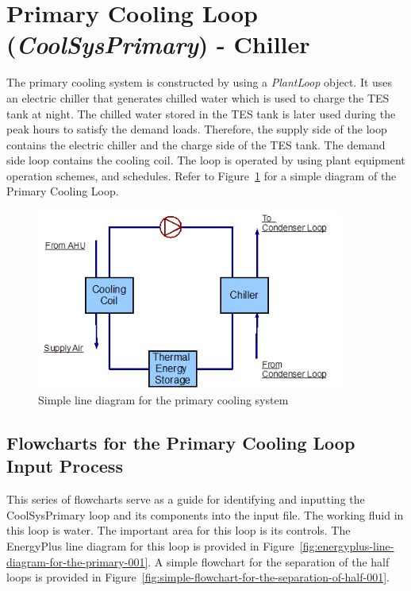 \section{Primary Cooling Loop (\emph{CoolSysPrimary}) - Chiller}\label{primary-cooling-loop-coolsysprimary---chiller}

The primary cooling system is constructed by using a \emph{PlantLoop} object. It uses an electric chiller that generates chilled water which is used to charge the TES tank at night. The chilled water stored in the TES tank is later used during the peak hours to satisfy the demand loads. Therefore, the supply side of the loop contains the electric chiller and the charge side of the TES tank. The demand side loop contains the cooling coil. The loop is operated by using plant equipment operation schemes, and schedules. Refer to Figure~\ref{fig:simple-line-diagram-for-the-primary-cooling} for a simple diagram of the Primary Cooling Loop.

\begin{figure}[hbtp] %
\centering
\includegraphics[width=0.9\textwidth, height=0.9\textheight, keepaspectratio=true]{media/image046.png}
\caption{Simple line diagram for the primary cooling system \protect \label{fig:simple-line-diagram-for-the-primary-cooling}}
\end{figure}

\subsection{Flowcharts for the Primary Cooling Loop Input Process}\label{flowcharts-for-the-primary-cooling-loop-input-process}

This series of flowcharts serve as a guide for identifying and inputting the CoolSysPrimary loop and its components into the input file. The working fluid in this loop is water. The important area for this loop is its controls. The EnergyPlus line diagram for this loop is provided in Figure~\ref{fig:energyplus-line-diagram-for-the-primary-001}. A simple flowchart for the separation of the half loops is provided in Figure~\ref{fig:simple-flowchart-for-the-separation-of-half-001}.

